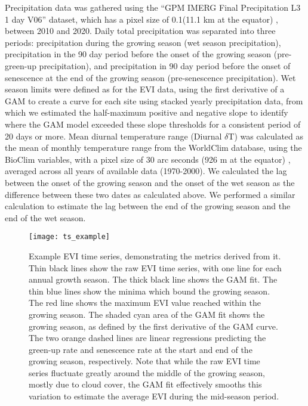 \documentclass[11pt,a4paper]{article}
\begin{document}
Precipitation data was gathered using the ``GPM IMERG Final Precipitation L3 1 day V06'' dataset, which has a pixel size of 0.1\textdegree (11.1 km at the equator) \citep{IMERG}, between 2010 and 2020. Daily total precipitation was separated into three periods: precipitation during the growing season (wet season precipitation), precipitation in the 90 day period before the onset of the growing season (pre-green-up precipitation), and precipitation in 90 day period before the onset of senescence at the end of the growing season (pre-senescence precipitation). Wet season limits were defined as for the EVI data, using the first derivative of a GAM to create a curve for each site using stacked yearly precipitation data, from which we estimated the half-maximum positive and negative slope to identify where the GAM model exceeded these slope thresholds for a consistent period of 20 days or more. Mean diurnal temperature range (Diurnal $\delta$T) was calculated as the mean of monthly temperature range from the WorldClim database, using the BioClim variables, with a pixel size of 30 arc seconds (926 m at the equator) \citep{Fick2017}, averaged across all years of available data (1970-2000). We calculated the lag between the onset of the growing season and the onset of the wet season as the difference between these two dates as calculated above. We performed a similar calculation to estimate the lag between the end of the growing season and the end of the wet season. 

\begin{figure}[H]
\centering
	\texttt{[image: ts\_example]}
	\caption{Example EVI time series, demonstrating the metrics derived from it. Thin black lines show the raw EVI time series, with one line for each annual growth season. The thick black line shows the GAM fit. The thin blue lines show the minima which bound the growing season. The red line shows the maximum EVI value reached within the growing season. The shaded cyan area of the GAM fit shows the growing season, as defined by the first derivative of the GAM curve. The two orange dashed lines are linear regressions predicting the green-up rate and senescence rate at the start and end of the growing season, respectively. Note that while the raw EVI time series fluctuate greatly around the middle of the growing season, mostly due to cloud cover, the GAM fit effectively smooths this variation to estimate the average EVI during the mid-season period.}
	\label{ts_example}
\end{figure}
\end{document}
